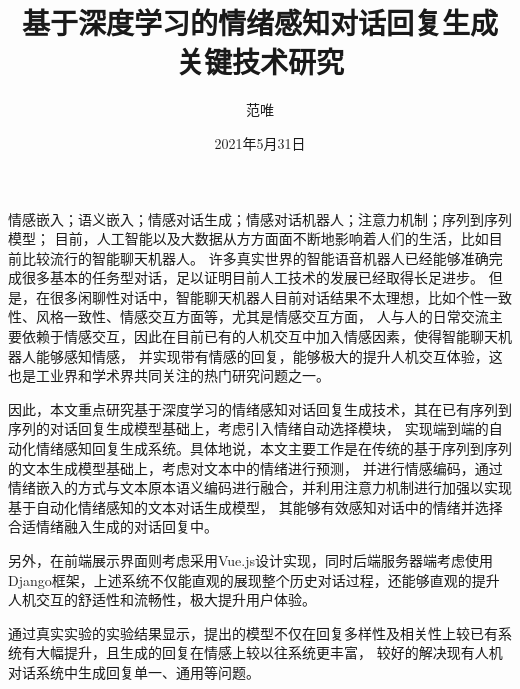 \documentclass[supercite]{HustGraduPaper}
\title{基于深度学习的情绪感知对话回复生成\\关键技术研究}
\author{范唯}
\date{2021年5月31日}
\theoremstyle{definition}
\begin{document}
\maketitle

\statement

\clearpage  
\phantom{s}

\begin{cnabstract}{情感嵌入；语义嵌入；情感对话生成；情感对话机器人；注意力机制；序列到序列模型；}
目前，人工智能以及大数据从方方面面不断地影响着人们的生活，比如目前比较流行的智能聊天机器人。
许多真实世界的智能语音机器人已经能够准确完成很多基本的任务型对话，足以证明目前人工技术的发展已经取得长足进步。
但是，在很多闲聊性对话中，智能聊天机器人目前对话结果不太理想，比如个性一致性、风格一致性、情感交互方面等，尤其是情感交互方面，
人与人的日常交流主要依赖于情感交互，因此在目前已有的人机交互中加入情感因素，使得智能聊天机器人能够感知情感，
并实现带有情感的回复，能够极大的提升人机交互体验，这也是工业界和学术界共同关注的热门研究问题之一。

因此，本文重点研究基于深度学习的情绪感知对话回复生成技术，其在已有序列到序列的对话回复生成模型基础上，考虑引入情绪自动选择模块，
实现端到端的自动化情绪感知回复生成系统。具体地说，本文主要工作是在传统的基于序列到序列的文本生成模型基础上，考虑对文本中的情绪进行预测，
并进行情感编码，通过情绪嵌入的方式与文本原本语义编码进行融合，并利用注意力机制进行加强以实现基于自动化情绪感知的文本对话生成模型，
其能够有效感知对话中的情绪并选择合适情绪融入生成的对话回复中。

另外，在前端展示界面则考虑采用Vue.js设计实现，同时后端服务器端考虑使用Django框架，上述系统不仅能直观的展现整个历史对话过程，还能够直观的提升人机交互的舒适性和流畅性，极大提升用户体验。

通过真实实验的实验结果显示，提出的模型不仅在回复多样性及相关性上较已有系统有大幅提升，且生成的回复在情感上较以往系统更丰富，
较好的解决现有人机对话系统中生成回复单一、通用等问题。
\end{cnabstract}

\clearpage  
\phantom{s}
\end{document}
